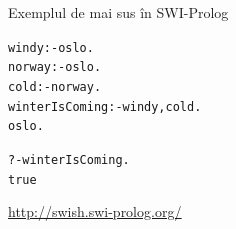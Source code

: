 \documentclass[xcolor=x11names,compress,10pt]{beamer}
\begin{document}




\begin{frame}{Exemplul de mai sus în SWI-Prolog}
\begin{alltt}
windy :- oslo. \\
norway :- oslo. \\
cold :- norway. \\
winterIsComing :- windy, cold. \\
oslo. \\
\end{alltt}

\bigskip
{}
\begin{alltt}
?- winterIsComing.\\
true
\end{alltt}

\bigskip
\underline{\url{http://swish.swi-prolog.org/}}
\end{frame}
%
%
%	
%		
%		
%		
%
%			
\end{document}
